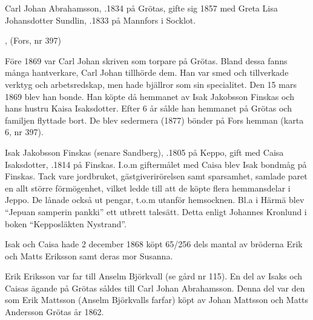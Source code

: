 Carl Johan Abrahamsson, .1834 på Grötas, gifte sig 1857 med Greta Lisa Johansdotter Sundlin, .1833 på Mannfors i Socklot.
\begin{jhchildren}
  \item {}, (Fors, nr 397)
  \item {}
  \item {}
  \item {}
  \item {}
  \item {}
\end{jhchildren}

Före 1869 var Carl Johan skriven som torpare på Grötas. Bland dessa fanns många hantverkare, Carl Johan tillhörde dem. Han var smed och tillverkade verktyg och arbetsredskap, men hade bjällror som sin specialitet. Den 15 mars 1869 blev han bonde. Han köpte då hemmanet av Isak Jakobsson Finskas och hans hustru Kaisa Isaksdotter. Efter 6 år sålde han hemmanet på Grötas och familjen flyttade bort. De blev sedermera (1877) bönder på Fors hemman (karta 6, nr 397).


Isak Jakobsson Finskas (senare Sandberg), .1805 på Keppo, gift med Caisa Isaksdotter, .1814 på Finskas. I.o.m giftermålet med Caisa blev Isak bondmåg på Finskas. Tack vare jordbruket, gästgiverirörelsen samt sparsamhet, samlade paret en allt större förmögenhet, vilket ledde till att de köpte flera hemmansdelar i Jeppo. De lånade också ut pengar, t.o.m utanför hemsocknen. Bl.a i Härmä blev ``Jepuan samperin pankki'' ett utbrett talesätt. Detta enligt Johannes Kronlund i boken ``Kepposläkten Nystrand''.

Isak och Caisa hade 2 december 1868 köpt 65/256 dels mantal av bröderna Erik och Matts Eriksson samt deras mor Susanna.


Erik Eriksson var far till Anselm Björkvall (se gård nr 115). En del av Isaks och Caisas ägande på Grötas såldes till Carl Johan Abrahamsson. Denna del var den som Erik Mattsson (Anselm Björkvalls farfar) köpt av Johan Mattsson och Matts Andersson Grötas år 1862.



